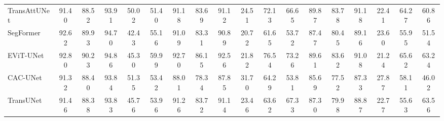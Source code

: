 \begin{table}[t]
{\begin{tabular}{l|ccccc|cccccc|cccccc}
TransAttUNet \cite{chen2023transattunet} 
& 91.40 & 88.52 & 93.91 & 50.02 & 51.40 
& 91.18 & 83.69 & 91.12 & 24.51 & 72.13 & 66.65 
& \cellcolor{SecondBestColor}\textcolor{SecondBestTextColor}{89.87} & \cellcolor{SecondBestColor}\textcolor{SecondBestTextColor}{83.78} & \cellcolor{SecondBestColor}\textcolor{SecondBestTextColor}{91.18} & 22.41 & 64.27 & 60.86 \\

SegFormer \cite{xie2021segformer}
& 92.62 & 89.93 & 94.70 & \cellcolor{BestColor}\textcolor{BestTextColor}{42.43} & 55.16 
& 91.09 & 83.31 & 90.89 & \cellcolor{SecondBestColor}\textcolor{SecondBestTextColor}{20.72} & 61.65 & 53.72 
& 87.47 & 80.45 & 89.16 & 23.60 & 55.95 & 51.54 \\

EViT-UNet \cite{li2025evit} 
& \cellcolor{SecondBestColor}\textcolor{SecondBestTextColor}{92.80} & \cellcolor{SecondBestColor}\textcolor{SecondBestTextColor}{90.23} & \cellcolor{SecondBestColor}\textcolor{SecondBestTextColor}{94.86} & 45.30 & \cellcolor{BestColor}\textcolor{BestTextColor}{59.99} 
& \cellcolor{SecondBestColor}\textcolor{SecondBestTextColor}{92.70} & \cellcolor{SecondBestColor}\textcolor{SecondBestTextColor}{86.15} & \cellcolor{SecondBestColor}\textcolor{SecondBestTextColor}{92.56} & 21.82 & \cellcolor{SecondBestColor}\textcolor{SecondBestTextColor}{76.54} & \cellcolor{SecondBestColor}\textcolor{SecondBestTextColor}{73.26} 
& 89.61 & 83.62 & 91.08 & 21.24 & \cellcolor{SecondBestColor}\textcolor{SecondBestTextColor}{65.62} & 63.24 \\

CAC-UNet \cite{zhu2021multi} 
& 91.32 & 88.40 & 93.84 & 51.35 & 53.42 
& 88.01 & 78.34 & 87.85 & 31.70 & 64.29 & 53.81 
& 85.69 & 77.52 & 87.33 & 27.87 & 58.11 & 46.02 \\

TransUNet \cite{chen2021transunet} 
& 91.46 & 88.38 & 93.83 & 45.76 & 53.96 
& 91.26 & 83.72 & 91.14 & 23.46 & 63.62 & 67.33 
& 87.30 & 79.98 & 88.87 & 22.77 & 55.63 & \cellcolor{SecondBestColor}\textcolor{SecondBestTextColor}{63.56} \\


\end{tabular}}
\end{table}
